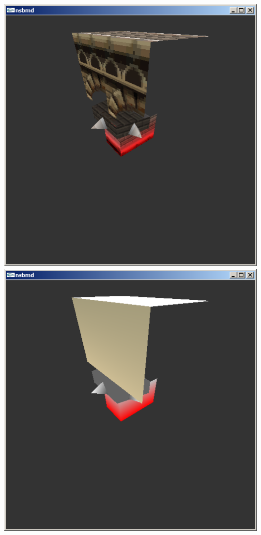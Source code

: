\documentclass[
]{book}
\begin{document}
\includegraphics{images/56_home_fast6191_romhackingguide_unrenamed_file___ders_romhackingguidegraphics3dtexturehack_1.png}\includegraphics{images/57_home_fast6191_romhackingguide_unrenamed_file___ders_romhackingguidegraphics3dtexturehack_2.png}
\end{document}
